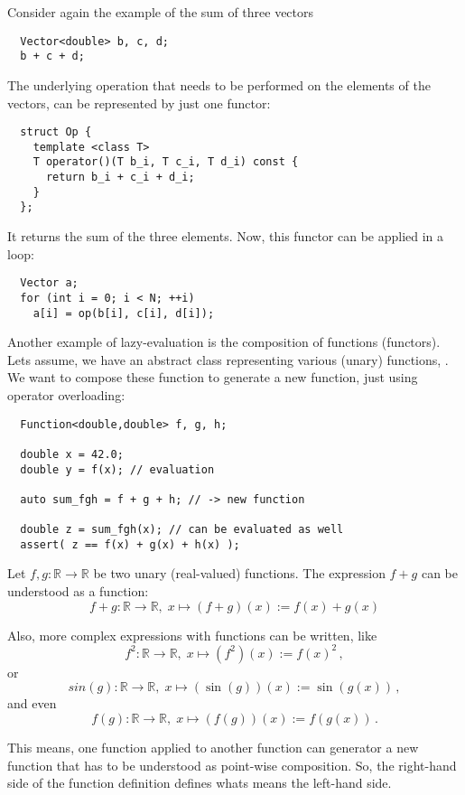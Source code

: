 \begin{example}
  Consider again the example of the sum of three vectors
  \begin{verbatim}
  Vector<double> b, c, d;
  b + c + d;
  \end{verbatim}
  The underlying operation that needs to be performed on the elements of the vectors, can be represented by
  just one functor:
  \begin{verbatim}
  struct Op {
    template <class T>
    T operator()(T b_i, T c_i, T d_i) const {
      return b_i + c_i + d_i;
    }
  };
  \end{verbatim}
  It returns the sum of the three elements. Now, this functor can be applied in a loop:
  \begin{verbatim}
  Vector a;
  for (int i = 0; i < N; ++i)
    a[i] = op(b[i], c[i], d[i]);
  \end{verbatim}
\end{example}

\begin{example}
  Another example of lazy-evaluation is the composition of functions (functors). Lets assume, we have an abstract class
  representing various (unary) functions, . We want to compose these function to generate
  a new function, just using operator overloading:
  \begin{verbatim}
  Function<double,double> f, g, h;

  double x = 42.0;
  double y = f(x); // evaluation

  auto sum_fgh = f + g + h; // -> new function

  double z = sum_fgh(x); // can be evaluated as well
  assert( z == f(x) + g(x) + h(x) );
  \end{verbatim}

  Let $f, g:\mathbb{R}\to\mathbb{R}$ be two unary (real-valued) functions. The expression $f+g$ can be understood as a function:
  \[
    f+g:\mathbb{R}\to\mathbb{R},\;x\mapsto(f+g)(x) := f(x) + g(x)
  \]

  Also, more complex expressions with functions can be written, like
  \[
    f^2:\mathbb{R}\to\mathbb{R},\;x\mapsto(f^2)(x) := f(x)^2\,,
  \]
  or
  \[
    sin(g):\mathbb{R}\to\mathbb{R},\;x\mapsto(\sin(g))(x) := \sin(g(x))\,,
  \]
  and even
  \[
    f(g):\mathbb{R}\to\mathbb{R},\;x\mapsto(f(g))(x) := f(g(x))\,.
  \]

  This means, one function applied to another function can generator a new function that has to be understood as point-wise composition. So, the right-hand
  side of the function definition defines whats means the left-hand side.
\end{example}

